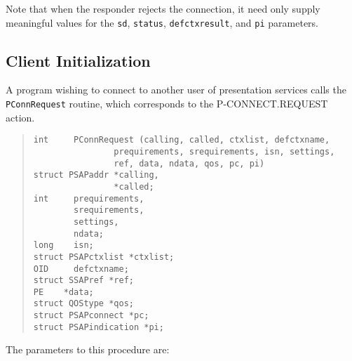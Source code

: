 Note that when the responder rejects the connection,
it need only supply meaningful values for the \verb"sd", \verb"status",
\verb"defctxresult", and \verb"pi" parameters.

\subsection	{Client Initialization}
A program wishing to connect to another user of presentation services calls the
\verb"PConnRequest" routine,
which corresponds to the {\sf P-CONNECT.RE\-QUEST\/} action.
\begin{quote}\small\begin{verbatim}
int     PConnRequest (calling, called, ctxlist, defctxname,
                prequirements, srequirements, isn, settings,
                ref, data, ndata, qos, pc, pi)
struct PSAPaddr *calling,
                *called;
int     prequirements,
        srequirements,
        settings,
        ndata;
long	isn;
struct PSAPctxlist *ctxlist;
OID     defctxname;
struct SSAPref *ref;
PE    *data;
struct QOStype *qos;
struct PSAPconnect *pc;
struct PSAPindication *pi;
\end{verbatim}\end{quote}
The parameters to this procedure are:\label{PConnRequest}

